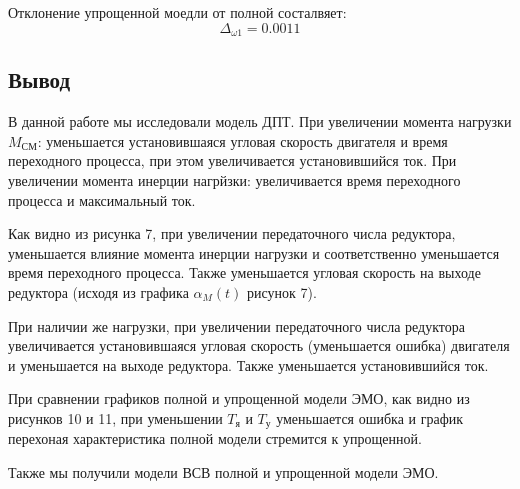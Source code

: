 \documentclass[a4paper, 12pt]{article}
\begin{document}
Отклонение упрощенной моедли от полной состалвяет:
\begin{equation}
    \Delta_{\omega1} = 0.0011
\end{equation}

\newpage
\begin{center}
\section*{Вывод}
\end{center} \par
В данной работе мы исследовали модель ДПТ. При увеличении момента нагрузки $M_\text{СМ}$: уменьшается установившаяся угловая скорость двигателя и время переходного процесса, при этом увеличивается установившийся ток. При увеличении момента инерции нагрйзки: увеличивается время переходного процесса и максимальный ток. \par
Как видно из рисунка 7, при увеличении передаточного числа редуктора, уменьшается влияние момента инерции нагрузки и соответственно уменьшается время переходного процесса. Также уменьшается угловая скорость на выходе редуктора (исходя из графика $\alpha_M(t)$ рисунок 7). \par
При наличии же нагрузки, при увеличении передаточного числа редуктора увеличивается установившаяся угловая скорость (уменьшается ошибка) двигателя и уменьшается на выходе редуктора. Также уменьшается установившийся ток. \par
При сравнении графиков полной и упрощенной модели ЭМО, как видно из рисунков 10 и 11, при уменьшении $T_\text{я}$ и $T_\text{у}$ уменьшается ошибка и график перехоная характеристика полной модели стремится к упрощенной. \par
Также мы получили модели ВСВ полной и упрощенной модели ЭМО.
\end{document}
